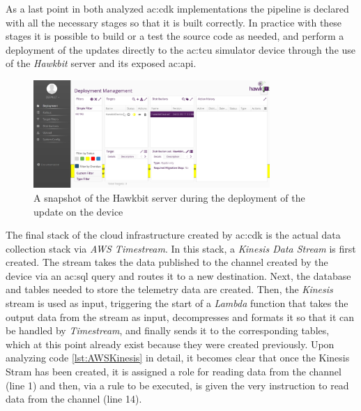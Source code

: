 As a last point in both analyzed \gls{ac:cdk} implementations the pipeline is declared with all the necessary stages so that it is built correctly. In practice with these stages it is possible to build or a test the source code as needed, and perform a deployment of the updates directly to the \gls{ac:tcu} simulator device through the use of the \textit{Hawkbit} server and its exposed \gls{ac:api}.
\begin{figure}[h]  %
    \centering
    \includegraphics[width=0.8\textwidth]{images/hawkbit_server.png}  %
    \caption{A snapshot of the Hawkbit server during the deployment of the update on the device}
    \label{fig:HawkbitServer}
\end{figure}
The final stack of the cloud infrastructure created by \gls{ac:cdk} is the actual data collection stack via \textit{AWS Timestream}. In this stack, a \textit{Kinesis Data Stream} is first created. The stream takes the data published to the channel created by the device via an \gls{ac:sql} query and routes it to a new destination. Next, the database and tables needed to store the telemetry data are created. Then, the \textit{Kinesis} stream is used as input, triggering the start of a \textit{Lambda} function that takes the output data from the stream as input, decompresses and formats it so that it can be handled by \textit{Timestream}, and finally sends it to the corresponding tables, which at this point already exist because they were created previously.
Upon analyzing code \ref{lst:AWSKinesis} in detail, it becomes clear that once the Kinesis Stram has been created, it is assigned a role for reading data from the channel (line 1) and then, via a rule to be executed, is given the very instruction to read data from the channel (line 14).
